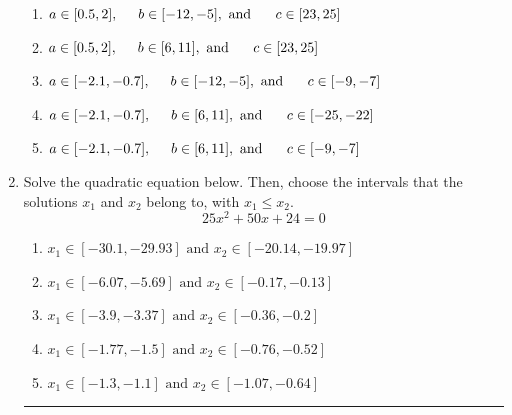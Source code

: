 \documentclass[14pt]{extbook}
\newcommand{\litem}[1]{\item#1\hspace*{-1cm}\rule{\textwidth}{0.4pt}}
\begin{document}
\begin{enumerate}
{\begin{center}
\end{center}
\begin{enumerate}[label=\Alph*.]
\item \( a \in [0.5, 2], \hspace*{5mm} b \in [-12, -5], \text{ and } \hspace*{5mm} c \in [23, 25] \)
\item \( a \in [0.5, 2], \hspace*{5mm} b \in [6, 11], \text{ and } \hspace*{5mm} c \in [23, 25] \)
\item \( a \in [-2.1, -0.7], \hspace*{5mm} b \in [-12, -5], \text{ and } \hspace*{5mm} c \in [-9, -7] \)
\item \( a \in [-2.1, -0.7], \hspace*{5mm} b \in [6, 11], \text{ and } \hspace*{5mm} c \in [-25, -22] \)
\item \( a \in [-2.1, -0.7], \hspace*{5mm} b \in [6, 11], \text{ and } \hspace*{5mm} c \in [-9, -7] \)

\end{enumerate} }
\litem{
Solve the quadratic equation below. Then, choose the intervals that the solutions $x_1$ and $x_2$ belong to, with $x_1 \leq x_2$.\[ 25x^{2} +50 x + 24 = 0 \]\begin{enumerate}[label=\Alph*.]
\item \( x_1 \in [-30.1, -29.93] \text{ and } x_2 \in [-20.14, -19.97] \)
\item \( x_1 \in [-6.07, -5.69] \text{ and } x_2 \in [-0.17, -0.13] \)
\item \( x_1 \in [-3.9, -3.37] \text{ and } x_2 \in [-0.36, -0.2] \)
\item \( x_1 \in [-1.77, -1.5] \text{ and } x_2 \in [-0.76, -0.52] \)
\item \( x_1 \in [-1.3, -1.1] \text{ and } x_2 \in [-1.07, -0.64] \)


\end{enumerate}}
\end{enumerate}
\end{document}
